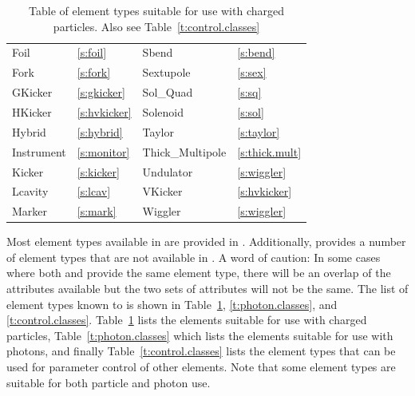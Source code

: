 \begin{table}[htb]
{\begin{tabular}{llll}
  Foil              & \ref{s:foil}          &  Sbend             & \ref{s:bend}       \\
  Fork              & \ref{s:fork}          &  Sextupole         & \ref{s:sex}        \\
  GKicker           & \ref{s:gkicker}       &  Sol_Quad          & \ref{s:sq}         \\
  HKicker           & \ref{s:hvkicker}      &  Solenoid          & \ref{s:sol}        \\
  Hybrid            & \ref{s:hybrid}        &  Taylor            & \ref{s:taylor}     \\
  Instrument        & \ref{s:monitor}       &  Thick_Multipole   & \ref{s:thick.mult} \\
  Kicker            & \ref{s:kicker}        &  Undulator         & \ref{s:wiggler}    \\
  Lcavity           & \ref{s:lcav}          &  VKicker           & \ref{s:hvkicker}   \\ 
  Marker            & \ref{s:mark}          &  Wiggler           & \ref{s:wiggler}    \\
  \bottomrule
\end{tabular}
} \caption{Table of element types suitable for use with charged particles. Also see
Table~\ref{t:control.classes}} \label{t:particle.classes}
\end{table}

Most element types available in \mad are provided in \bmad.  Additionally, \bmad provides a number
of element types that are not available in \mad.  A word of caution: In some cases where both \mad
and \bmad provide the same element type, there will be an overlap of the attributes available but
the two sets of attributes will not be the same.  The list of element types known to \bmad is shown
in Table~\ref{t:particle.classes}, \ref{t:photon.classes}, and \ref{t:control.classes}.
Table~\ref{t:particle.classes} lists the elements suitable for use with charged particles,
Table~\ref{t:photon.classes} which lists the elements suitable for use with photons, and finally
Table~\ref{t:control.classes} lists the  element types that can be used for parameter
control of other elements. Note that some element types are suitable for both particle and photon
use.

